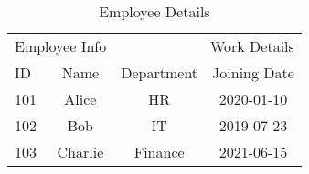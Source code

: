 \documentclass{article}
\begin{document}
\begin{table}[h!]
\centering
\caption{Employee Details}
\label{tab:employee}
\begin{tabular}{lccc}
\toprule
\multicolumn{2}{r}{Employee Info} & \multicolumn{2}{r}{Work Details} \\
ID & Name & Department & Joining Date \\
\midrule
101 & Alice & HR & 2020-01-10 \\
102 & Bob & IT & 2019-07-23 \\
103 & Charlie & Finance & 2021-06-15 \\
\bottomrule
\end{tabular}
\end{table}
\end{document}
